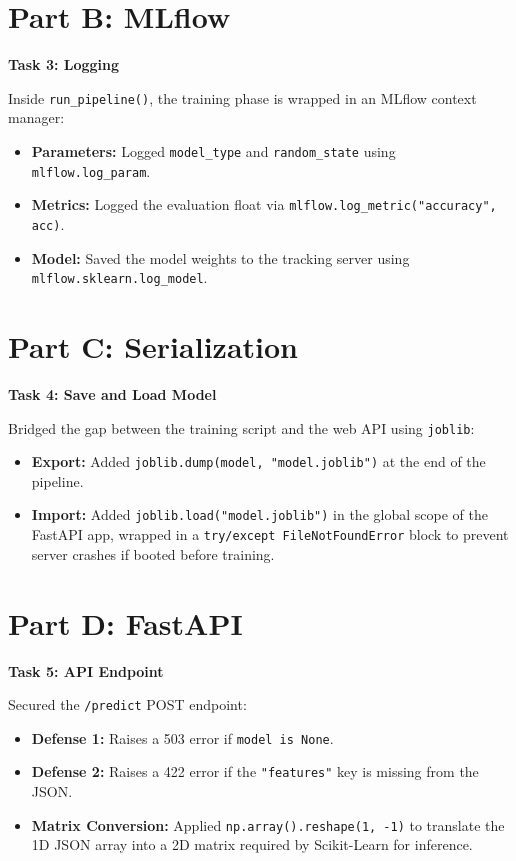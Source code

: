 \documentclass[12pt,a4paper]{article}
\begin{document}
\section*{Part B: MLflow}

\begin{tcolorbox}
\textbf{Task 3: Logging}

Inside \texttt{run\_pipeline()}, the training phase is wrapped in an MLflow context manager:
\begin{itemize}
  \item \textbf{Parameters:} Logged \texttt{model\_type} and \texttt{random\_state} using \texttt{mlflow.log\_param}.
  \item \textbf{Metrics:} Logged the evaluation float via \texttt{mlflow.log\_metric("accuracy", acc)}.
  \item \textbf{Model:} Saved the model weights to the tracking server using \texttt{mlflow.sklearn.log\_model}.
\end{itemize}
\end{tcolorbox}

\section*{Part C: Serialization}

\begin{tcolorbox}
\textbf{Task 4: Save and Load Model}

Bridged the gap between the training script and the web API using \texttt{joblib}:
\begin{itemize}
  \item \textbf{Export:} Added \texttt{joblib.dump(model, "model.joblib")} at the end of the pipeline.
  \item \textbf{Import:} Added \texttt{joblib.load("model.joblib")} in the global scope of the FastAPI app, wrapped in a \texttt{try/except FileNotFoundError} block to prevent server crashes if booted before training.
\end{itemize}
\end{tcolorbox}

\section*{Part D: FastAPI}

\begin{tcolorbox}
\textbf{Task 5: API Endpoint}

Secured the \texttt{/predict} POST endpoint:
\begin{itemize}
  \item \textbf{Defense 1:} Raises a 503 error if \texttt{model is None}.
  \item \textbf{Defense 2:} Raises a 422 error if the \texttt{"features"} key is missing from the JSON.
  \item \textbf{Matrix Conversion:} Applied \texttt{np.array().reshape(1, -1)} to translate the 1D JSON array into a 2D matrix required by Scikit-Learn for inference.
\end{itemize}
\end{tcolorbox}
\end{document}
